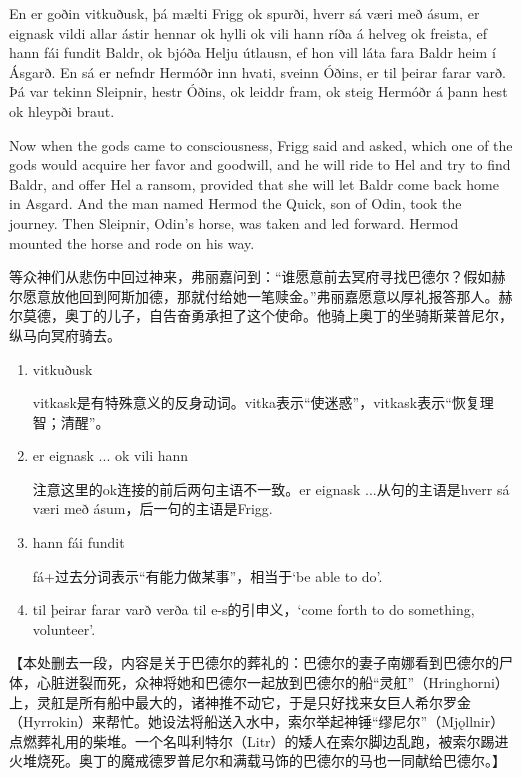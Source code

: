 \begin{paracol}{2}
  En er goðin vitkuðusk, þá mælti Frigg ok spurði, hverr sá væri með ásum, er eignask vildi allar ástir hennar ok hylli ok vili hann ríða á helveg ok freista, ef hann fái fundit Baldr, ok bjóða Helju útlausn, ef hon vill láta fara Baldr heim í Ásgarð. En sá er nefndr Hermóðr inn hvati, sveinn Óðins, er til þeirar farar varð. Þá var tekinn Sleipnir, hestr Óðins, ok leiddr fram, ok steig Hermóðr á þann hest ok hleypði braut.
  \switchcolumn

  Now when the gods came to consciousness, Frigg said and asked, which one of the gods would acquire her favor and goodwill, and he will ride to Hel and try to find Baldr, and offer Hel a ransom, provided that she will let Baldr come back home in Asgard. And the man named Hermod the Quick, son of Odin, took the journey. Then Sleipnir, Odin's horse, was taken and led forward. Hermod mounted the horse and rode on his way.
\end{paracol}
\begin{translation*}{}
  等众神们从悲伤中回过神来，弗丽嘉问到：“谁愿意前去冥府寻找巴德尔？假如赫尔愿意放他回到阿斯加德，那就付给她一笔赎金。”弗丽嘉愿意以厚礼报答那人。赫尔莫德，奥丁的儿子，自告奋勇承担了这个使命。他骑上奥丁的坐骑斯莱普尼尔，纵马向冥府骑去。
\end{translation*}
\begin{grammar*}{}
  \begin{enumerate}[leftmargin=*]
    \item vitkuðusk

          vitkask是有特殊意义的反身动词。vitka表示“使迷惑”，vitkask表示“恢复理智；清醒”。

    \item er eignask ... ok vili hann

          注意这里的ok连接的前后两句主语不一致。er eignask ...从句的主语是hverr sá væri með ásum，后一句的主语是Frigg.

    \item hann fái fundit

          fá+过去分词表示“有能力做某事”，相当于`be able to do'.

    \item til þeirar farar varð
          verða til e-s的引申义，`come forth to do something, volunteer'.
  \end{enumerate}
\end{grammar*}
\medskip
【本处删去一段，内容是关于巴德尔的葬礼的：巴德尔的妻子南娜看到巴德尔的尸体，心脏迸裂而死，众神将她和巴德尔一起放到巴德尔的船“灵舡”（Hringhorni）上，灵舡是所有船中最大的，诸神推不动它，于是只好找来女巨人希尔罗金（Hyrrokin）来帮忙。她设法将船送入水中，索尔举起神锤“缪尼尔”（Mjǫllnir）点燃葬礼用的柴堆。一个名叫利特尔（Litr）的矮人在索尔脚边乱跑，被索尔踢进火堆烧死。奥丁的魔戒德罗普尼尔和满载马饰的巴德尔的马也一同献给巴德尔。】
